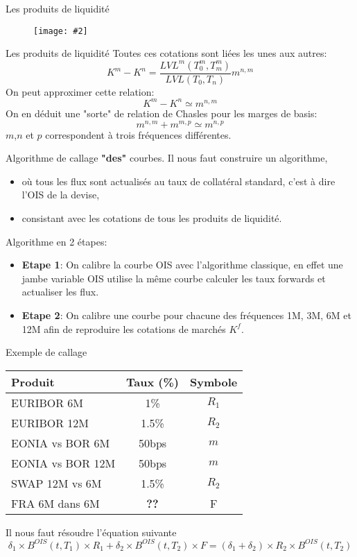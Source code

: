 \documentclass{beamer}
\newcommand{\FIG}[2]{\texttt{[image: \#2]}}
\begin{document}
\begin{frame}{Les produits de liquidité}
\begin{figure}[h]
\vspace{2mm}
\FIG{13cm}{figures/basis.png} 
\vspace{1mm}
\end{figure}
\end{frame}

\begin{frame}{Les produits de liquidité}
Toutes ces cotations sont liées les unes aux autres:\\
\[
K^m-K^n=\frac{LVL^m(T^m_0,T^m_m)}{LVL(T_0,T_n)} m^{n,m}
\]
On peut approximer cette relation:
\[
K^m-K^n \simeq m^{n,m}
\]
On en déduit une "sorte" de relation de Chasles pour les marges de basis:
\[
m^{n,m}+m^{m,p} \simeq m^{n,p}
\]
$m$,$n$ et $p$ correspondent à trois fréquences différentes.
\end{frame}

\begin{frame}{Algorithme de callage \textbf{"des"} courbes.}
Il nous faut construire un algorithme, 
\begin{itemize}
\item où tous les flux sont actualisés au taux de collatéral standard, c'est à dire l'OIS de la devise,
\item consistant avec les cotations de tous les produits de liquidité.
\end{itemize}
\vspace{0.5cm}
Algorithme en 2 étapes:
\begin{itemize}
\item \textbf{Etape 1}: On calibre la courbe OIS avec l'algorithme classique, en effet une jambe variable OIS utilise la même courbe calculer les taux forwards et actualiser les flux.
\item \textbf{Etape 2}: On calibre une courbe pour chacune des fréquences 1M, 3M, 6M et 12M afin de reproduire les cotations de marchés $K^f$.
\end{itemize}
\end{frame}

\begin{frame}{Exemple de callage}
\begin{center}
\begin{tabular}{|l|c|c|}
\hline
Produit & Taux (\%) & Symbole\\
\hline
EURIBOR 6M & 1\% & $R_1$ \\
EURIBOR 12M & 1.5\% & $R_2$ \\
EONIA vs BOR 6M & 50bps & $m$\\
EONIA vs BOR 12M & 50bps & $m$\\
SWAP 12M vs 6M & 1.5\% & $R_2$ \\
FRA 6M dans 6M & \textbf{??} & F \\
\hline
\end{tabular}
\end{center}
Il nous faut résoudre l'équation suivante
\[
\delta_1 \times B^{OIS}(t,T_1) \times R_1 + \delta_2 \times B^{OIS}(t,T_2) \times F = (\delta_1 + \delta_2) \times R_2 \times B^{OIS}(t,T_2)
\]
\end{frame}
\end{document}
